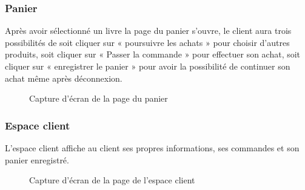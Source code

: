 \subsubsection{Panier}
Après avoir sélectionné un livre la page du panier s’ouvre, le client aura trois possibilités de soit cliquer sur « poursuivre les achats » pour choisir d’autres produits, soit cliquer sur « Passer la commande » pour effectuer son achat, soit cliquer sur « enregistrer le panier » pour avoir la possibilité de continuer son achat même après déconnexion.
\begin{figure}[H]
    \centering
    \caption{Capture d'écran de la page du panier}
\end{figure}
\newpage
\subsubsection{Espace client}
L'espace client affiche au client ses propres informations, ses commandes et son panier enregistré.
\begin{figure}[H]
    \centering
    \caption{Capture d'écran de la page de l'espace client}
\end{figure}

